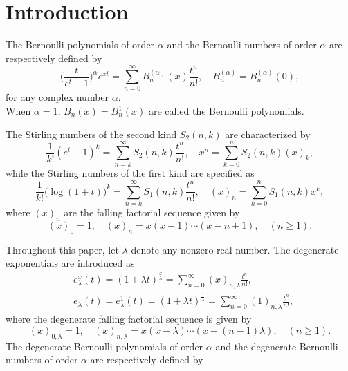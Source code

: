 \documentclass[a4paper,11pt]{amsart}
\begin{document}
\section{Introduction}
The Bernoulli polynomials of order $\alpha$ and the Bernoulli numbers of order $\alpha$ are respectively defined by 
\begin{equation} \label{1}
\Big(\frac{t}{e^{t}-1}\Big)^{\alpha}e^{x t}=\sum_{n=0}^{\infty}B_{n}^{(\alpha)}(x)\frac{t^{n}}{n!},\quad B_{n}^{(\alpha)}=B_{n}^{(\alpha)}(0),
\end{equation}
for any complex number $\alpha$. \\
When $\alpha=1$, $B_{n}(x)=B_{n}^{1}(x)$ are called the Bernoulli polynomials. \par
The Stirling numbers of the second kind $S_{2}(n,k)$ are characterized by
\begin{equation} \label{2}
\frac{1}{k!}(e^{t}-1)^{k}=\sum_{n=k}^{\infty}S_{2}(n,k)\frac{t^{n}}{n!}, \quad x^{n}=\sum_{k=0}^{n}S_{2}(n,k)(x)_{k},
\end{equation}
while the Stirling numbers of the first kind are specified as
\begin{equation} \label{3}
\frac{1}{k!}\big(\log(1+t)\big)^{k}=\sum_{n=k}^{\infty}S_{1}(n,k)\frac{t^{n}}{n!},\quad (x)_{n}=\sum_{k=0}^{n}S_{1}(n,k)x^{k},
\end{equation}
where $(x)_{n}$ are the falling factorial sequence given by
\begin{equation} \label{4}
(x)_{0}=1,\quad (x)_{n}=x(x-1)\cdots(x-n+1),\quad(n \ge 1).
\end{equation} \par
Throughout this paper, let $\lambda$ denote any nonzero real number. 
The degenerate exponentials are introduced as
\begin{equation} \label{5}
\begin{aligned}
&e_{\lambda}^{x}(t)=(1+\lambda t)^{\frac{x}{\lambda}}=\sum_{n=0}^{\infty}(x)_{n,\lambda}\frac{t^{n}}{n!}, \\
&e_{\lambda}(t)=e_{\lambda}^{1}(t)=(1+\lambda t)^{\frac{1}{\lambda}}=\sum_{n=0}^{\infty}(1)_{n,\lambda}\frac{t^{n}}{n!},
\end{aligned} 
\end{equation}
where the degenerate falling factorial sequence is given by
\begin{equation} \label{6}
(x)_{0,\lambda}=1,\quad (x)_{n,\lambda}=x(x-\lambda)\cdots(x-(n-1)\lambda),\quad(n \ge 1).
\end{equation}
The degenerate Bernoulli polynomials of order $\alpha$ and the degenerate Bernoulli numbers of order $\alpha$ are respectively defined by
\end{document}
